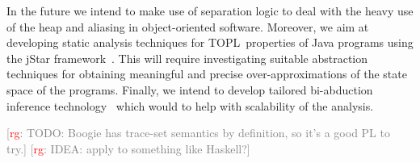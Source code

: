 \documentclass[preprint]{sigplanconf} %
\newcommand{\TPL}{TOPL}
\newcommand{\note}[2]{\textcolor{gray}{[\textcolor{red}{#1}: #2]}}
\newcommand{\rg}[1]{\note{rg}{#1}}
\theoremstyle{definition}
\theoremstyle{remark}
\begin{document}
In the future we intend to make use of  separation logic to deal with the  heavy use of the heap and aliasing in object-oriented software. Moreover, we aim at developing static analysis techniques for \TPL \ properties of Java programs using the jStar framework~\cite{DBLP:conf/oopsla/DistefanoP08}.
This will require investigating suitable abstraction techniques for obtaining meaningful and precise over-approximations
of the state space of the programs. Finally, we intend to develop tailored bi-abduction inference technology~\cite{dblp:conf/popl/CalcagnoDOY09} which would to help with scalability of the analysis.

\rg{TODO: Boogie has trace-set semantics by definition, so it's a good PL to try.}
\rg{IDEA: apply to something like Haskell?}


\softraggedright


\end{document}
